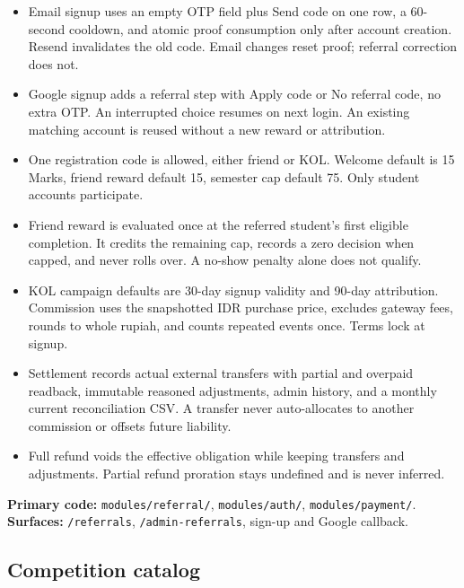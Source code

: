\documentclass[11pt,a4paper]{article}
\newcommand{\code}[1]{\texttt{#1}}
\begin{document}
\begin{itemize}
	\item Email signup uses an empty OTP field plus Send code on one row, a 60-second cooldown, and atomic proof consumption only after account creation. Resend invalidates the old code. Email changes reset proof; referral correction does not.
	\item Google signup adds a referral step with Apply code or No referral code, no extra OTP. An interrupted choice resumes on next login. An existing matching account is reused without a new reward or attribution.
	\item One registration code is allowed, either friend or KOL. Welcome default is 15 Marks, friend reward default 15, semester cap default 75. Only student accounts participate.
	\item Friend reward is evaluated once at the referred student's first eligible completion. It credits the remaining cap, records a zero decision when capped, and never rolls over. A no-show penalty alone does not qualify.
	\item KOL campaign defaults are 30-day signup validity and 90-day attribution. Commission uses the snapshotted IDR purchase price, excludes gateway fees, rounds to whole rupiah, and counts repeated events once. Terms lock at signup.
	\item Settlement records actual external transfers with partial and overpaid readback, immutable reasoned adjustments, admin history, and a monthly current reconciliation CSV. A transfer never auto-allocates to another commission or offsets future liability.
	\item Full refund voids the effective obligation while keeping transfers and adjustments. Partial refund proration stays undefined and is never inferred.
\end{itemize}

\noindent\textbf{Primary code:} \code{modules/referral/}, \code{modules/auth/}, \code{modules/payment/}. \textbf{Surfaces:} \code{/referrals}, \code{/admin-referrals}, sign-up and Google callback.

\subsection{Competition catalog}
\end{document}
